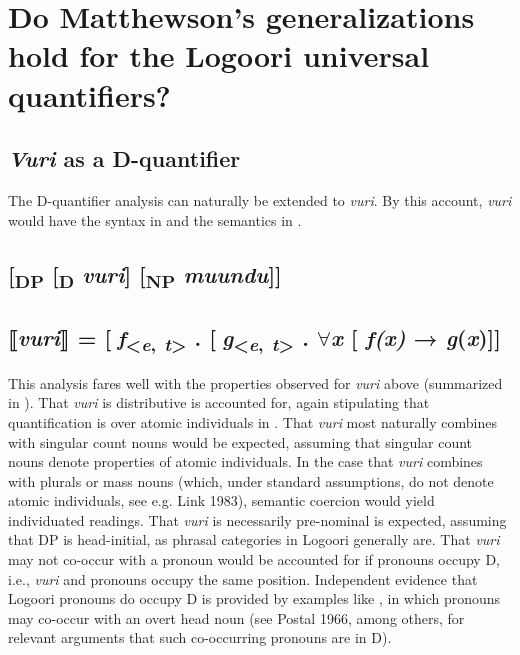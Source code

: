 \documentclass[output=paper]{langsci/langscibook}
\begin{document}
\section{Do Matthewson's generalizations hold for the Logoori universal quantifiers?}
\subsection{\textit{Vuri} as a D-quantifier}

The D-quantifier analysis can naturally be extended to \textit{vuri}. By this account, \textit{vuri} would have the syntax in  and the semantics in .

\subsection{      [\textsubscript{DP} [\textsubscript{D} \textit{vuri}] [\textsubscript{NP} \textit{muundu}]]}
\subsection{      ⟦\textit{vuri}⟧ = [\textit{f}\textsubscript{<}\textit{\textsubscript{e}}\textsubscript{,} \textit{\textsubscript{t}}\textsubscript{>} . [\textit{g}\textsubscript{<}\textit{\textsubscript{e}}\textsubscript{,} \textit{\textsubscript{t}}\textsubscript{>} . ${\forall}$\textit{x} [ \textit{f(x)} → \textit{g}(\textit{x})]]}

This analysis fares well with the properties observed for \textit{vuri} above (summarized in ). That \textit{vuri} is distributive is accounted for, again stipulating that quantification is over atomic individuals in . That \textit{vuri} most naturally combines with singular count nouns would be expected, assuming that singular count nouns denote properties of atomic individuals. In the case that \textit{vuri} combines with plurals or mass nouns (which, under standard assumptions, do not denote atomic individuals, see e.g. Link 1983), semantic coercion would yield individuated readings. That \textit{vuri} is necessarily pre-nominal is expected, assuming that DP is head-initial, as phrasal categories in Logoori generally are. That \textit{vuri} may not co-occur with a pronoun would be accounted for if pronouns occupy D, i.e., \textit{vuri} and pronouns occupy the same position. Independent evidence that Logoori pronouns do occupy D is provided by examples like , in which pronouns may co-occur with an overt head noun (see Postal 1966, among others, for relevant arguments that such co-occurring pronouns are in D).
\end{document}
